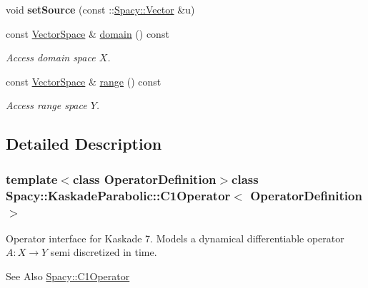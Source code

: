 \begin{DoxyCompactItemize}
\item 
\hypertarget{classSpacy_1_1KaskadeParabolic_1_1C1Operator_ad0ec50bdc0afbdf35fb4a7308bdcaad6}{void {\bfseries set\-Source} (const \-::\hyperlink{classSpacy_1_1Vector}{Spacy\-::\-Vector} \&u)}\label{classSpacy_1_1KaskadeParabolic_1_1C1Operator_ad0ec50bdc0afbdf35fb4a7308bdcaad6}

\item 
\hypertarget{classSpacy_1_1OperatorBase_a2588f9b3e0188820c4c494e63293dc6f}{const \hyperlink{classSpacy_1_1VectorSpace}{Vector\-Space} \& \hyperlink{classSpacy_1_1OperatorBase_a2588f9b3e0188820c4c494e63293dc6f}{domain} () const }\label{classSpacy_1_1OperatorBase_a2588f9b3e0188820c4c494e63293dc6f}

\begin{DoxyCompactList}\small\item\em Access domain space $X$. \end{DoxyCompactList}\item 
\hypertarget{classSpacy_1_1OperatorBase_ab19d3b7a6f290b1079248f1e567e53d6}{const \hyperlink{classSpacy_1_1VectorSpace}{Vector\-Space} \& \hyperlink{classSpacy_1_1OperatorBase_ab19d3b7a6f290b1079248f1e567e53d6}{range} () const }\label{classSpacy_1_1OperatorBase_ab19d3b7a6f290b1079248f1e567e53d6}

\begin{DoxyCompactList}\small\item\em Access range space $Y$. \end{DoxyCompactList}\end{DoxyCompactItemize}


\subsection{Detailed Description}
\subsubsection*{template$<$class Operator\-Definition$>$class Spacy\-::\-Kaskade\-Parabolic\-::\-C1\-Operator$<$ Operator\-Definition $>$}

Operator interface for Kaskade 7. Models a dynamical differentiable operator $A:X\rightarrow Y$ semi discretized in time. 

\begin{DoxySeeAlso}{See Also}
\hyperlink{classSpacy_1_1C1Operator}{Spacy\-::\-C1\-Operator} 
\end{DoxySeeAlso}


